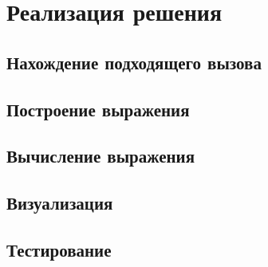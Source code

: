 \section{Реализация решения}\label{chapter3}

\subsection{Нахождение подходящего вызова}

\subsection{Построение выражения}

\subsection{Вычисление выражения}

\subsection{Визуализация}

\subsection{Тестирование}
